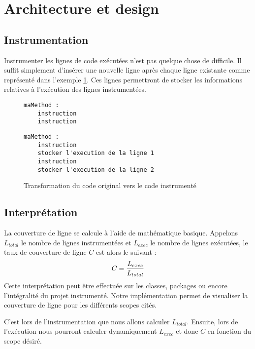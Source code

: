\section{Architecture et design}

\subsection{Instrumentation}
\label{instrumentation}

Instrumenter les lignes de code exécutées n'est pas quelque chose de difficile. Il suffit simplement d'insérer une nouvelle ligne après chaque ligne existante comme représenté dans l'exemple   \ref{example_instrumentation}. Ces lignes permettront de stocker les informations relatives à l'exécution des lignes instrumentées.

\begin{figure}[h]
\begin{lstlisting}[linewidth=5.0cm]
maMethod :
	instruction
	instruction
\end{lstlisting}
\begin{lstlisting}[linewidth=11cm]
maMethod :
	instruction
	stocker l'execution de la ligne 1
	instruction
	stocker l'execution de la ligne 2
\end{lstlisting}

\caption{Transformation du code original vers le code instrumenté}
\label{example_instrumentation}
\end{figure}

\subsection{Interprétation}
\label{interpretation}

La couverture de ligne se calcule à l'aide de mathématique basique. Appelons $L_{total}$ le nombre de lignes instrumentées et $L_{exec}$ le nombre de lignes exécutées, le taux de couverture de ligne $C$ est alors le suivant :
\begin{equation}
C = { L_{exec} \over L_{total} }
\end{equation}
Cette interprétation peut être effectuée sur les classes, packages ou encore l'intégralité du projet instrumenté. Notre implémentation permet de visualiser la couverture de ligne pour les différents scopes cités.
\par C'est lors de l'instrumentation que nous allons calculer $L_{total}$. Ensuite, lors de l'exécution nous pourront calculer dynamiquement $L_{exec}$ et donc $C$ en fonction du scope désiré.


